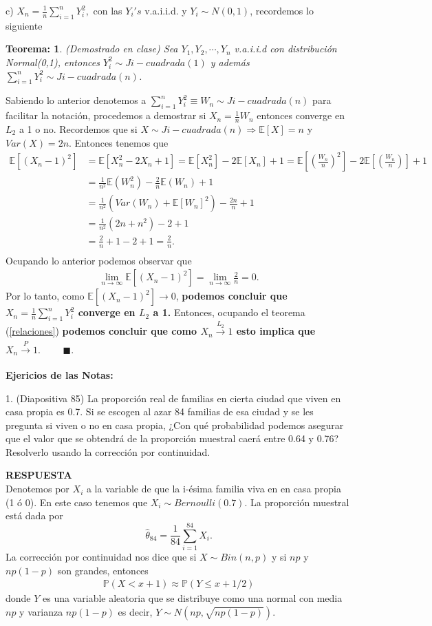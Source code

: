 \documentclass[11pt,letterpaper]{article}
\newcommand{\mP}{\mathbb{P}}
\newcommand{\mE}{\mathbb{E}}
\newcommand{\res}{\textbf{RESPUESTA}\\}
\newcommand{\fin}{$\blacksquare.$}
\newtheorem{thmt}{Teorema:}
\newcommand{\s}{\sum_{i=1}^n}
\begin{document}
c) $X_n=\frac{1}{n}\s Y_i^2,$ con las $Y_i's$ v.a.i.i.d. y $Y_i\sim N(0,1)$, recordemos lo siguiente
\begin{framed}
    \begin{thmt} \label{limite}
    (Demostrado en clase) Sea $Y_1,Y_2, \cdots , Y_n$ v.a.i.i.d con distribución Normal(0,1), entonces $Y_i^2\sim Ji-cuadrada(1)$ y además $\s Y_i^2\sim Ji-cuadrada(n)$. 
    \end{thmt}
\end{framed}
Sabiendo lo anterior denotemos a $\s Y_i^2 \equiv W_n\sim Ji-cuadrada(n)$ para facilitar la notación, procedemos a demostrar si $X_n=\frac{1}{n} W_n$ entonces converge en $L_2$ a 1 o no. Recordemos que si $X\sim Ji-cuadrada(n)\Rightarrow \mE[X]=n$ y $Var(X)=2n$. Entonces tenemos que 
 \begin{align*}
\mE[\left( X_n-1\right)^2]&=\mE[X_n^2-2X_n+1]=\mE[X_n^2]-2\mE[X_n]+1= \mE\left[\left(\frac{W_n}{n}\right)^2\right]-2\mE\left[\left(\frac{W_n}{n}\right)\right]+1\\
&=\frac{1}{n ^2}\mE(W_n^2)-\frac{2}{ n }\mE(W_n)+1\\
&=\frac{1}{n ^2}\left(Var(W_n)+\mE[W_n]^2\right)-\frac{2n}{ n }+1\\
&=\frac{1}{n ^2}\left(2n+n^2\right)-2+1\\
&=\frac{2}{n} + 1-2+1=\frac{2}{n}.\\
\end{align*}
Ocupando lo anterior podemos observar que 
\begin{align*}
\lim_{n\rightarrow \infty} \mE[\left( X_n-1\right)^2] = \lim_{n\rightarrow \infty} \frac{2}{n}=0.
\end{align*}
Por lo tanto, como $\mE[\left( X_n-1\right)^2]\rightarrow 0$, \textbf{podemos concluir que $X_n=\frac{1}{n} \s Y_i^2$ converge en $L_2$ a 1. } Entonces, ocupando el teorema (\ref{relaciones}) \textbf{podemos concluir que como $X_n\xrightarrow[]{L_2} 1$ esto  implica que $X_n\xrightarrow[]{P} 1.$} \ \ \ \ \fin

\textbf{Ejericios de las Notas:}

1. (Diapositiva 85) La proporción real de familias en cierta ciudad que viven en casa propia es 0.7. Si se escogen al azar 84 familias de esa ciudad y se les pregunta si viven o no en casa propia, ¿Con qué probabilidad podemos asegurar que el valor que se obtendrá de la proporción muestral caerá entre 0.64 y 0.76? Resolverlo usando la corrección por continuidad.
 
\res Denotemos por $X_i$ a la variable de que la i-ésima familia viva en en casa propia (1 ó 0). En este caso tenemos que $X_i\sim Bernoulli(0.7)$. La proporción muestral está dada por 
$$\hat{\theta}_{84}=\frac{1}{84}\sum_{i=1}^{84}X_i.$$
La corrección por continuidad nos dice que si $X\sim Bin(n,p)$ y si $np$ y $np(1-p)$ son grandes, entonces 
\begin{align*}
\mP(X<x+1)\approx \mP(Y\leq x+1/2)
\end{align*}
donde $Y$ es una variable aleatoria que se distribuye como una normal con media $np$ y varianza $np(1-p)$ es decir, $Y\sim N(np, \sqrt{np(1-p)})$.
\end{document}
